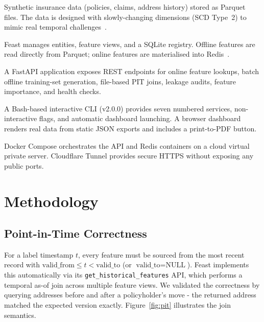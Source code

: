 \documentclass[11pt,a4paper]{article}
\begin{document}
\begin{description}[style=nextline,leftmargin=2.2em,font=\bfseries]
\item[Data Layer] Synthetic insurance data (policies, claims, address history) stored as Parquet files.
The data is designed with slowly-changing dimensions (SCD Type~2) to mimic real temporal challenges~\cite{scd}.
\item[Feature Store Layer] Feast manages entities, feature views, and a SQLite registry.
Offline features are read directly from Parquet; online features are materialised into Redis~\cite{redis}.
\item[Serving Layer] A FastAPI application exposes REST endpoints for online feature lookups, batch offline training-set generation, file-based PIT joins, leakage audits, feature importance, and health checks.
\item[Client Layer] A Bash-based interactive CLI (v2.0.0) provides seven numbered services, non-interactive flags, and automatic dashboard launching.
A browser dashboard renders real data from static JSON exports and includes a print-to-PDF button.
\item[Deployment Layer] Docker Compose orchestrates the API and Redis containers on a cloud virtual private server.
Cloudflare Tunnel provides secure HTTPS without exposing any public ports.
\end{description}

\section{Methodology}

\subsection{Point-in-Time Correctness}
For a label timestamp $t$, every feature must be sourced from the most recent record with $\text{valid\_from} \le t < \text{valid\_to}$ (or $\text{valid\_to} = \text{NULL}$).
Feast implements this automatically via its \texttt{get\_historical\_features} API, which performs a temporal as-of join across multiple feature views.
We validated the correctness by querying addresses before and after a policyholder's move - the returned address matched the expected version exactly.
Figure~\ref{fig:pit} illustrates the join semantics.
\end{document}
